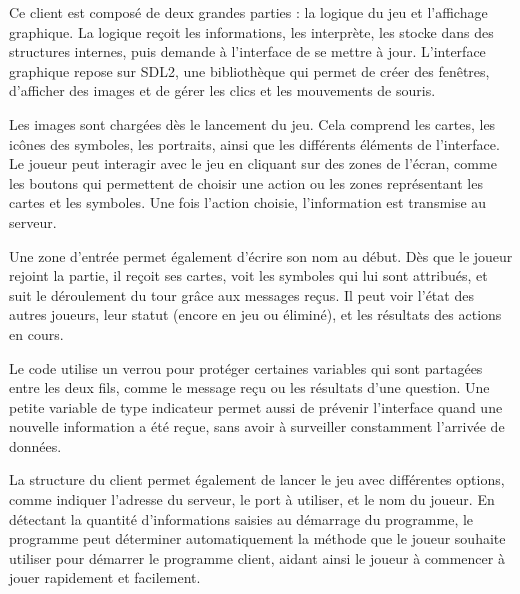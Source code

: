 \documentclass{article}
\begin{document}
Ce client est composé de deux grandes parties : la logique du jeu et l'affichage graphique. 
La logique reçoit les informations, les interprète, les stocke dans des structures internes, puis demande à l'interface de se mettre à jour. 
L'interface graphique repose sur SDL2, une bibliothèque qui permet de créer des fenêtres, d'afficher des images et de gérer les clics et les mouvements de souris.

Les images sont chargées dès le lancement du jeu. 
Cela comprend les cartes, les icônes des symboles, les portraits, ainsi que les différents éléments de l'interface. 
Le joueur peut interagir avec le jeu en cliquant sur des zones de l'écran, comme les boutons qui permettent de choisir une action ou les zones représentant les cartes et les symboles. 
Une fois l'action choisie, l'information est transmise au serveur.

Une zone d'entrée permet également d'écrire son nom au début. 
Dès que le joueur rejoint la partie, il reçoit ses cartes, voit les symboles qui lui sont attribués, et suit le déroulement du tour grâce aux messages reçus. 
Il peut voir l'état des autres joueurs, leur statut (encore en jeu ou éliminé), et les résultats des actions en cours.

Le code utilise un verrou pour protéger certaines variables qui sont partagées entre les deux fils, comme le message reçu ou les résultats d'une question. 
Une petite variable de type indicateur permet aussi de prévenir l'interface quand une nouvelle information a été reçue, sans avoir à surveiller constamment l'arrivée de données.

La structure du client permet également de lancer le jeu avec différentes options, comme indiquer l'adresse du serveur, le port à utiliser, et le nom du joueur. 
En détectant la quantité d'informations saisies au démarrage du programme, 
le programme peut déterminer automatiquement la méthode que le joueur souhaite utiliser pour démarrer le programme client, 
aidant ainsi le joueur à commencer à jouer rapidement et facilement.
\end{document}

